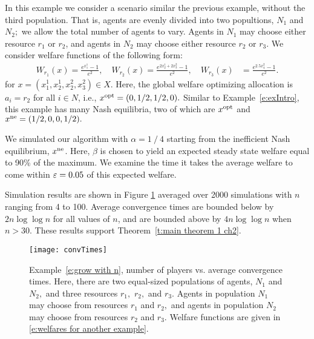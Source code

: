 \begin{example}\label{e:grow with n}

In this example we consider a scenario similar the previous example, without the third population. That is, agents are evenly divided into two popultions, $N_1$ and $N_2;$ we allow the total number of agents to vary. Agents in $N_1$ may choose either resource $r_1 $ or $r_2$, and agents in $N_2$ may choose either resource $r_2$ or $r_3.$
We consider welfare functions of the following form:
\begin{align}
W_{r_1}(x) = \frac{e^ {x_1^1} - 1}{e^ {2}},\quad
W_{r_2}(x) = \frac{e^{2x_2^1+2x_3^2} - 1}{e^ {2}},\quad
W_{r_3}(x) &= \frac{e^{2.5x_4^2} - 1}{e^ {2}}.\label{e:welfares for another example}
\end{align}
for $x = (x_1^1,x_2^1,x_2^2,x_3^2)\in X.$
Here, the global welfare optimizing allocation is $a_i = r_2$ for all $i\in N$, i.e., $x^{\rm opt} = (0,1/2,1/2,0).$   Similar to Example~\ref{e:exIntro}, this example has many Nash equilibria, two of which are $x^{\rm opt}$ and $x^{\rm ne} = (1/2,0,0,1/2).$

We simulated our algorithm with $\alpha = 1\mathop{/}4$ starting from the inefficient Nash equilibrium, $x^{\rm ne}$.  Here, $\beta$ is chosen to yield an expected steady state welfare equal to 90\% of the maximum. We examine the time it takes the average welfare to come within $\varepsilon = 0.05$ of this expected welfare.

Simulation results are shown in Figure \ref{f:convTimes} averaged over 2000 simulations with $n$ ranging from 4 to 100.  Average convergence times are bounded below by $2n\log\log n$ for all values of $n$, and are bounded above by $4n \log\log n$ when $n>30$.
These results support  Theorem~\ref{t:main theorem 1 ch2}.


\begin{figure}[ht]
  \centering
    \texttt{[image: convTimes]}
  \caption{Example~\ref{e:grow with n}, number of players vs. average convergence times. Here, there are two equal-sized populations of agents, $N_1$ and $N_2,$ and three resources $r_1,$ $r_2,$ and $r_3.$ 
Agents in population $N_1$ may choose from resources $r_1$ and $r_2,$ and agents in population $N_2$ may choose from resources $r_2$ and $r_3.$ Welfare functions are given in \eqref{e:welfares for another example}. \label{f:convTimes}}
\end{figure}


\end{example}


